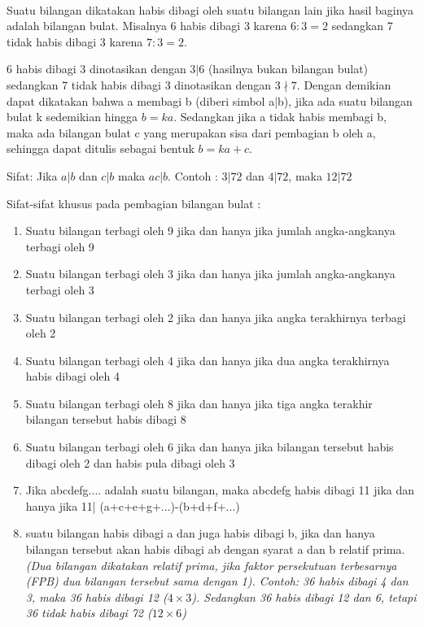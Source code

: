 \paragraph*{}
		Suatu bilangan dikatakan habis dibagi oleh suatu bilangan lain jika hasil baginya adalah bilangan bulat. Misalnya 6 habis dibagi 3 karena $6 : 3 = 2$ sedangkan 7 tidak habis dibagi 3 karena $7 : 3 = 2$. 
\par		
		6 habis dibagi 3 dinotasikan dengan $3|6$ (hasilnya bukan bilangan bulat) sedangkan 7 tidak habis dibagi 3 dinotasikan dengan $3\nmid 7$. Dengan demikian dapat dikatakan bahwa a membagi b (diberi simbol a|b), jika ada suatu bilangan bulat k sedemikian hingga $b = ka$.
		Sedangkan jika a tidak habis membagi b, maka ada bilangan bulat c yang
		merupakan sisa dari pembagian b oleh a, sehingga dapat ditulis sebagai bentuk $b = ka + c.$\par 
		Sifat: Jika $a|b$ dan $c|b$ maka $ac|b$. Contoh : $3|72$ dan $4|72$, maka $12|72$ \par 
		Sifat-sifat khusus pada pembagian bilangan bulat : 
		\begin{enumerate}
			\item Suatu bilangan terbagi oleh 9 jika dan hanya jika jumlah angka-angkanya
			terbagi oleh 9
			\item Suatu bilangan terbagi oleh 3 jika dan hanya jika jumlah angka-angkanya
			terbagi oleh 3
			\item Suatu bilangan terbagi oleh 2 jika dan hanya jika angka terakhirnya terbagi
			oleh 2
			\item Suatu bilangan terbagi oleh 4 jika dan hanya jika dua angka terakhirnya
			habis dibagi oleh 4
			\item Suatu bilangan terbagi oleh 8 jika dan hanya jika tiga angka terakhir
			bilangan tersebut habis dibagi 8
			\item Suatu bilangan terbagi oleh 6 jika dan hanya jika bilangan tersebut habis
			dibagi oleh 2 dan habis pula dibagi oleh 3
			\item Jika abcdefg.... adalah suatu bilangan, maka abcdefg habis dibagi 11 jika
			dan hanya jika 11| (a+c+e+g+...)-(b+d+f+...)
			\item suatu bilangan habis dibagi a dan juga habis dibagi b, jika dan hanya
			bilangan tersebut akan habis dibagi ab dengan syarat a dan b relatif prima. \textit{(Dua bilangan dikatakan relatif prima, jika faktor persekutuan terbesarnya
			(FPB) dua bilangan tersebut sama dengan 1). Contoh: 36 habis dibagi 4
			dan 3, maka 36 habis dibagi 12 ($4\times 3$). Sedangkan 36 habis dibagi 12 dan 6,
			tetapi 36 tidak habis dibagi 72 ($12 \times 6$)	}
		\end{enumerate}		

